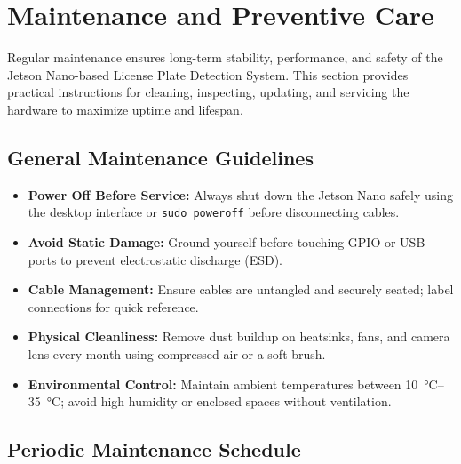 %
%
%



\chapter{Maintenance and Preventive Care}

Regular maintenance ensures long-term stability, performance, and safety of the Jetson Nano-based License Plate Detection System.  
This section provides practical instructions for cleaning, inspecting, updating, and servicing the hardware to maximize uptime and lifespan.

\section{General Maintenance Guidelines}

\begin{itemize}
	\item \textbf{Power Off Before Service:} Always shut down the Jetson Nano safely using the desktop interface or \texttt{sudo poweroff} before disconnecting cables.
	\item \textbf{Avoid Static Damage:} Ground yourself before touching GPIO or USB ports to prevent electrostatic discharge (ESD).
	\item \textbf{Cable Management:} Ensure cables are untangled and securely seated; label connections for quick reference.
	\item \textbf{Physical Cleanliness:} Remove dust buildup on heatsinks, fans, and camera lens every month using compressed air or a soft brush.
	\item \textbf{Environmental Control:} Maintain ambient temperatures between \SI{10}{\celsius}–\SI{35}{\celsius}; avoid high humidity or enclosed spaces without ventilation.
\end{itemize}

\vspace{0.5cm}

\section{Periodic Maintenance Schedule}

